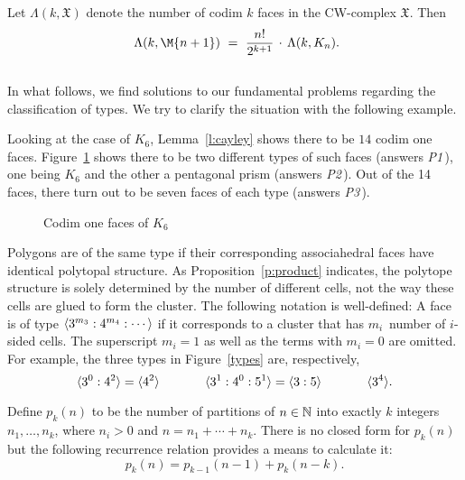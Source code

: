 \documentclass[10pt]{amsart}
\begin{document}
\begin{prop} 
Let $\Lambda(k, {\mathfrak X})$ denote the number of codim $k$ faces in the CW-complex ${\mathfrak X}$. Then
$$\ \Lambda(k, \M{n+1})  \ = \ {\displaystyle \frac{n!}{2^{k+1}}} \, \cdot \, \Lambda(k, K_n).$$
\label{p:k-to-m}
\end{prop}


\subsection{}
In what follows, we find solutions to our fundamental problems regarding the classification of types. We try to clarify the situation with the following example.

\begin{exmp}
Looking at the case of $K_6$, Lemma~\ref{l:cayley} shows there to be $14$ codim one faces.  Figure~\ref{k6codim1} shows there to be two different types of such faces (answers {\em P1}\,), one being $K_6$ and the other a pentagonal prism (answers {\em P2}\,).  Out of the 14 faces, there turn out to be seven faces of each type (answers {\em P3}\,). 
\end{exmp}

\begin{figure} [h]
\caption{Codim one faces of $K_6$}
\label{k6codim1}
\end{figure}

Polygons are of the same type if their corresponding associahedral faces have identical polytopal structure. As Proposition~\ref{p:product} indicates, the polytope structure is solely determined by the number of different cells, not the way these cells are glued to form the cluster. The following notation is well-defined:  A face is of type ${\langle} 3^{m_3} : 4^{m_4} : \cdots {\rangle}$ if it corresponds to a cluster that has $m_i$~number of $i$-sided cells.  The superscript $m_i = 1$ as well as the terms with $m_i = 0$ are omitted. For example, the three types in Figure~\ref{types} are, respectively, $${\langle} 3^0 : 4^2 {\rangle} = {\langle} 4^2 {\rangle} \hspace{.5in} {\langle} 3^1 : 4^0 : 5^1 {\rangle} = {\langle} 3 : 5 {\rangle} \hspace{.5in} {\langle} 3^4 {\rangle}.$$

Define $p_k(n)$ to be the number of partitions of $n \in {\mathbb N}$ into exactly $k$ integers $n_1, \ldots, n_k$, where $n_i > 0$ and $n = n_1 + \cdots + n_k$.  There is no closed form for $p_k(n)$ but the following recurrence relation provides a means to calculate it:
\begin{equation}
p_k(n) = p_{k-1}(n-1) + p_k(n-k).
\label{e:part}
\end{equation}
\end{document}
